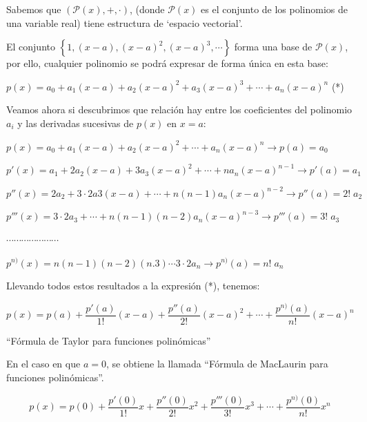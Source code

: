 	Sabemos que $\left( \mathcal{P}(x), +, \cdot\right)$, (donde  $\mathcal{P}(x)$ es el conjunto de los polinomios de una variable real) tiene estructura de `espacio vectorial'. 
	
	El conjunto $\left\{1, (x-a),(x-a)^2,(x-a)^3,\cdots \right\}$ forma una base de $\mathcal{P}(x)$, por ello, cualquier polinomio se podrá expresar de forma única en esta base:
	
	$p(x)=a_0+a_1(x-a)+a_2(x-a)^2+a_3(x-a)^3+\cdots +a_n(x-a)^n$ (*)
	
	Veamos ahora si descubrimos que relación hay entre los coeficientes del polinomio $a_i$ y las derivadas sucesivas de $p(x)$ en $x=a$:
	
	$p(x)=a_0+a_1(x-a)+a_2(x-a)^2+\cdots +a_n(x-a)^n \to p(a)=a_0$
	
	$p'(x)=a_1+2a_2(x-a)+3a_3(x-a)^2+\cdots +n a_n(x-a)^{n-1} \to p'(a)=a_1$
	
	$p''(x)=2a_2+3\cdot 2 a3 (x-a)+ \cdots + n(n-1)a_n(x-a)^{n-2} \to p''(a)=2!\; a_2$
	
	$p'''(x)=3\cdot 2 a_3+ \cdots + n(n-1)(n-2)a_n (x-a)^{n-3}\to p'''(a)=3!\; a_3$
	
	$\cdots \cdots \cdots \cdots \cdots \cdots \cdots$
	
	$p^{n)}(x)=n(n-1)(n-2)(n.3)\cdots 3\cdot 2 a_n \to p^{n)}(a)=n!\; a_n  $
	
	Llevando todos estos resultados a la expresión (*), tenemos:

\begin{cuadro-naranja}		
	\begin{equation*}
		\label{Taylor-polinomios}
		  p(x)=p(a)+\dfrac {p'(a)}{1!} (x-a)+\dfrac {p''(a)}{2!} (x-a)^2+\cdots +\dfrac {p^{n)}(a)}{n!} (x-a)^n 
	\end{equation*}
	
	\centerline{``Fórmula de Taylor para funciones polinómicas''}
	
	En el caso en que $a=0$, se obtiene la llamada ``Fórmula de MacLaurin para funciones polinómicas''.
	
	\begin{equation*}
		\label{MacLaurin-polinomios}
		 p(x)=p(0)+\dfrac {p'(0)}{1!} x+\dfrac {p''(0)}{2!} x^2+\dfrac {p'''(0)}{3!}x^3+\cdots +\dfrac {p^{n)}(0)}{n!} x^n 
	\end{equation*}
\end{cuadro-naranja}
	
